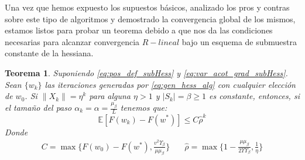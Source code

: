 \documentclass{book}
\theoremstyle{plain}
\newtheorem{thm}{Teorema}[section]
\theoremstyle{definition}
\theoremstyle{remark}
\begin{document}
Una vez que hemos expuesto los supuestos básicos, analizado los pros y contras sobre este tipo de algoritmos y demostrado la convergencia global de los mismos, estamos listos para probar un teorema debido a \cite{ROOSTA} que nos da las condiciones necesarias para alcanzar convergencia $R-lineal$ bajo un esquema de submuestra constante de la hessiana.
\begin{thm}\label{r-linear}
Suponiendo \ref{eq:pos_def_subHess} y \ref{eq:var_acot_grad_subHess}. Sean $\{w_k\}$ las iteraciones generadas por \ref{eq:gen_hess_alg} con cualquier elección de $w_0$. Si $\|X_k\|  = \eta^k$ para alguna $\eta > 1$ y $|S_k| = \beta\geq 1$ es constante, entonces, si el tamaño del paso $\alpha_k = \alpha = \frac{\mu_\beta}{L}$ tenemos que:
\begin{equation}\label{eq:r-linear}
    \mathbb{E}[F(w_k) - F(w^*)] \leq C\hat{\rho}^k
\end{equation}
Donde
\begin{equation}
   \begin{split}
       C = \max\bigg\{F(w_0) - F(w^*), \frac{v^2\Upsilon_\beta}{\mu\mu_\beta}\bigg\} & \quad \hat{\rho} = \max\bigg\{1- \frac{\mu\mu_\beta}{2\Upsilon\Upsilon_\beta}, \frac{1}{\eta}\bigg\}
   \end{split}
\end{equation}
\end{thm}
\end{document}
